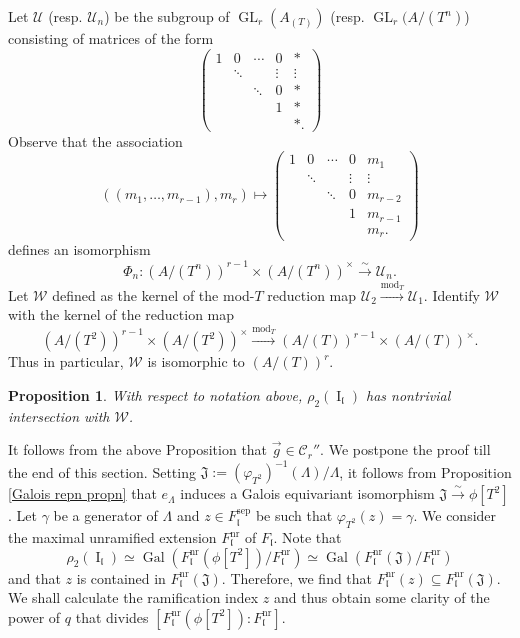 \documentclass[11pt]{amsart}
\newtheorem{proposition}[theorem]{Proposition}
\newcommand{\fl}{\mathfrak{l}}
\newcommand{\cU}{\mathcal{U}}
\newcommand{\cC}{\mathcal{C}}
\newcommand{\op}[1]{\operatorname{#1}}
\numberwithin{equation}{section}
\begin{document}
\par Let $\cU$ (resp. $\cU_n$) be the subgroup of $\op{GL}_r(A_{(T)})$ (resp. $\op{GL}_r(A/(T^n)$) consisting of matrices of the form
\[\left(\begin{array}{ccccc}1 & 0 & \cdots & 0 & \ast \\ & \ddots &  & \vdots & \vdots \\ &  & \ddots & 0 & \ast \\ &  &  & 1 &  \ast \\ &  &  & &  \ast. \end{array}\right)\] Observe that the association
\[\left((m_1, \dots, m_{r-1}), m_r\right)\mapsto \left(\begin{array}{ccccc}1 & 0 & \cdots & 0 & m_1 \\ & \ddots &  & \vdots & \vdots \\ &  & \ddots & 0 & m_{r-2} \\ &  &  & 1 &  m_{r-1} \\ &  &  & &  m_r. \end{array}\right)\]
defines an isomorphism
\[\Phi_n: \left(A/(T^n)\right)^{r-1}\times \left(A/(T^n)\right)^\times \xrightarrow{\sim} \cU_n.\]
Let $\mathcal{W}$ defined as the kernel of the mod-$T$ reduction map $\cU_2\xrightarrow{\op{mod}_T} \cU_1$. Identify $\mathcal{W}$ with the kernel of the reduction map 
\[\left(A/(T^2)\right)^{r-1}\times \left(A/(T^2)\right)^\times \xrightarrow{\op{mod}_T} \left(A/(T)\right)^{r-1}\times \left(A/(T)\right)^\times .\]
Thus in particular, $\mathcal{W}$ is isomorphic to $(A/(T))^r$. 
\begin{proposition}\label{prop rho2 contains U2}
    With respect to notation above, $\rho_2(\op{I}_{\fl})$ has nontrivial intersection with $\mathcal{W}$.
\end{proposition}
It follows from the above Proposition that $\vec{g}\in \cC_r''$. We postpone the proof till the end of this section. Setting $\mathfrak{J}:=(\varphi_{T^2})^{-1}(\Lambda)/\Lambda$, it follows from Proposition \ref{Galois repn propn} that $e_\Lambda$ induces a Galois equivariant isomorphism $\mathfrak{J}\xrightarrow{\sim} \phi[T^2]$. Let $\gamma$ be a generator of $\Lambda$ and $z\in F_{\mathfrak{l}}^{\op{sep}}$ be such that $\varphi_{T^2}(z)=\gamma$. We consider the maximal unramified extension $F_{\mathfrak{l}}^{\op{nr}}$ of $F_{\mathfrak{l}}$. Note that
\[\rho_2(\op{I}_{\mathfrak{l}})\simeq \op{Gal}\left(F_{\mathfrak{l}}^{\op{nr}}(\phi[T^2])/F_{\mathfrak{l}}^{\op{nr}}\right)\simeq \op{Gal}\left(F_{\mathfrak{l}}^{\op{nr}}(\mathfrak{J})/F_{\mathfrak{l}}^{\op{nr}}\right)\]
and that $z$ is contained in $F_{\mathfrak{l}}^{\op{nr}}(\mathfrak{J})$. Therefore, we find that $F_{\mathfrak{l}}^{\op{nr}}(z)\subseteq F_{\mathfrak{l}}^{\op{nr}}(\mathfrak{J})$. We shall calculate the ramification index $z$ and thus obtain some clarity of the power of $q$ that divides $[F_{\mathfrak{l}}^{\op{nr}}(\phi[T^2]): F_{\mathfrak{l}}^{\op{nr}}]$.
\end{document}
